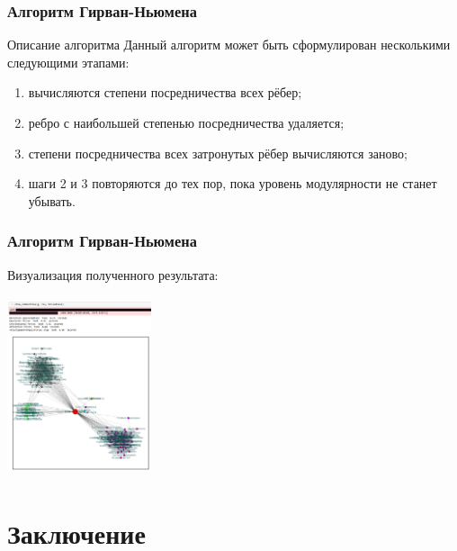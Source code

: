 \documentclass{spbseu}
\begin{document}
    \begin{frame}
		\frametitle{Алгоритм Гирван-Ньюмена}
        \begin{block}{Описание алгоритма}
            \justifying
            Данный алгоритм может быть сформулирован несколькими следующими этапами:
            \begin{enumerate}
                \item вычисляются степени посредничества всех рёбер;
                \item ребро с наибольшей степенью посредничества удаляется;
                \item степени посредничества всех затронутых рёбер вычисляются заново;
                \item шаги 2 и 3 повторяются до тех пор, пока уровень модулярности не станет убывать.
            \end{enumerate}
        \end{block}
    \end{frame}
    
    \begin{frame}
		\frametitle{Алгоритм Гирван-Ньюмена}
        Визуализация полученного результата:
        \begin{center}
            \includegraphics[width=160px,height=200px]{images/gn_results}
        \end{center}
    \end{frame}
    
    \section{Заключение}
\end{document}
